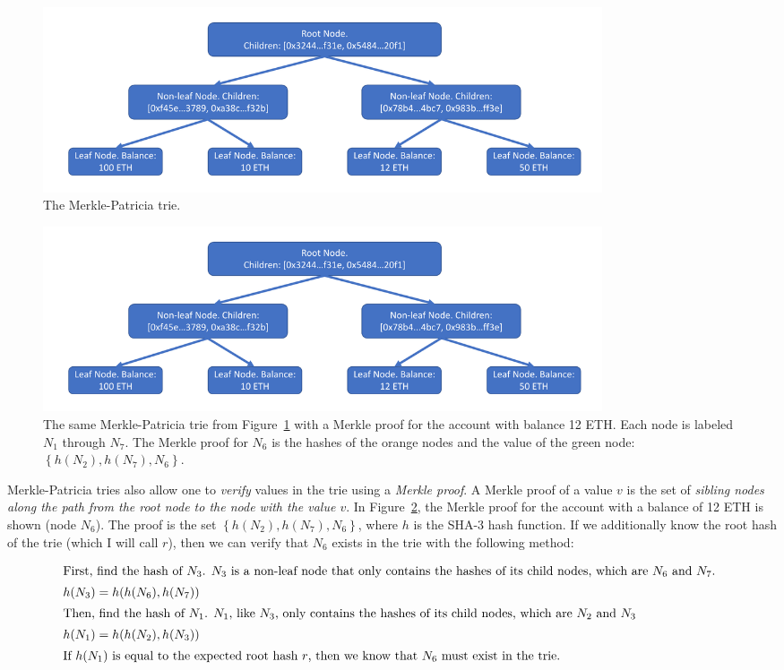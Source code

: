 \documentclass[12pt]{article}
\newcommand{\set}[1]{\left\{#1\right\}}
\newcommand{\figurewidth}{0.8\textwidth}
\begin{document}
\begin{figure}[H]
  \centering
  \includegraphics[width=\figurewidth, page=1]{../figures/background/trie/tree_with_merkle_proof.pdf}
  \caption{The Merkle-Patricia trie.} \label{fig:trie}
\end{figure}

\begin{figure}[H]
  \centering
  \includegraphics[width=\figurewidth, page=2]{../figures/background/trie/tree_with_merkle_proof.pdf}
  \caption{The same Merkle-Patricia trie from Figure~\ref{fig:trie} with a Merkle proof for the account with balance 12 ETH. Each node is labeled $N_1$ through $N_7$. The Merkle proof for $N_6$ is the hashes of the orange nodes and the value of the green node: $\set{h(N_2), h(N_7), N_6}$. } \label{fig:triewithproof}
\end{figure}

Merkle-Patricia tries also allow one to \emph{verify} values in the trie using a \emph{Merkle proof}. A Merkle proof of a value $v$ is the set of \emph{sibling nodes along the path from the root node to the node with the value $v$}. In Figure~\ref{fig:triewithproof}, the Merkle proof for the account with a balance of 12 ETH is shown (node $N_6$). The proof is the set $\set{h(N_2), h(N_7), N_6}$, where $h$ is the SHA-3 hash function. If we additionally know the root hash of the trie (which I will call $r$), then we can verify that $N_6$ exists in the trie with the following method:

\begin{align*}
  \shortintertext{First, find the hash of $N_3$. $N_3$ is a non-leaf node that only contains the hashes of its child nodes, which are $N_6$ and $N_7$. }
  h(N_3) &= h(h(N_6), h(N_7)) \\
  \shortintertext{Then, find the hash of $N_1$. $N_1$, like $N_3$, only contains the hashes of its child nodes, which are $N_2$ and $N_3$}
  h(N_1) &= h(h(N_2), h(N_3)) \\
  \shortintertext{If $h(N_1)$ is equal to the expected root hash $r$, then we know that $N_6$ must exist in the trie.}
\end{align*}
\end{document}
